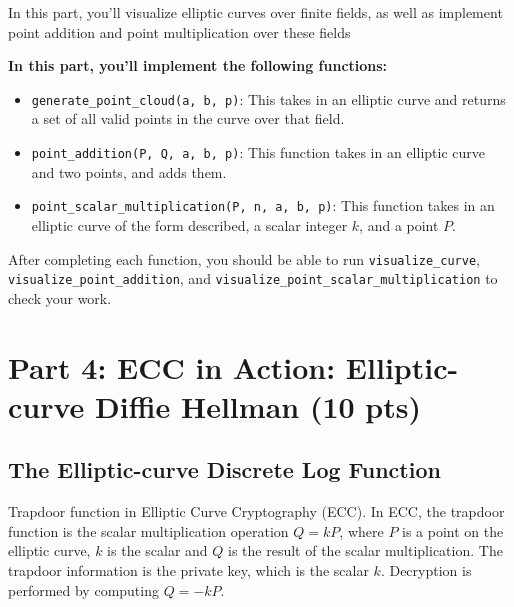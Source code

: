 \documentclass{article}
\begin{document}
    \begin{tcolorbox}[enhanced,interior style={top color=Plum!20,bottom color=Plum!30}]
        In this part, you'll visualize elliptic curves over finite fields, as well as implement point addition and point multiplication over these fields
    
        \textbf{In this part, you'll implement the following functions:}
        \begin{itemize}
            \item \lstinline{generate_point_cloud(a, b, p)}: This takes in an elliptic curve and returns a set of all valid points in the curve over that field.
            \item \lstinline{point_addition(P, Q, a, b, p)}: This function takes in an elliptic curve and two points, and adds them.
            \item \lstinline{point_scalar_multiplication(P, n, a, b, p)}: This function takes in an elliptic curve of the form described, a scalar integer $k$, and a point $P$.
        \end{itemize}
        After completing each function, you should be able to run \lstinline{visualize_curve}, \lstinline{visualize_point_addition}, and \lstinline{visualize_point_scalar_multiplication} to check your work.
    \end{tcolorbox}

\section*{Part 4: ECC in Action: Elliptic-curve Diffie Hellman (10 pts)}



\subsection*{The Elliptic-curve Discrete Log Function}



    \vspace{3mm}
    Trapdoor function in Elliptic Curve Cryptography (ECC). In ECC, the trapdoor function is the scalar multiplication operation $Q = kP$, where $P$ is a point on the elliptic curve, $k$ is the scalar and $Q$ is the result of the scalar multiplication. The trapdoor information is the private key, which is the scalar $k$. Decryption is performed by computing $Q = -kP$.
\end{document}
